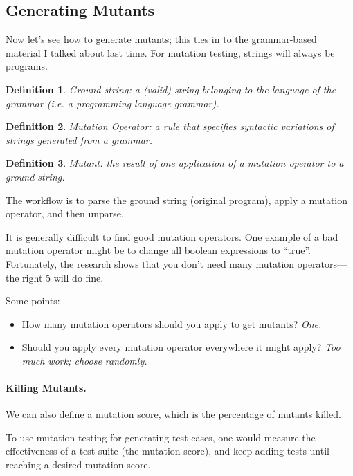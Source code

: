 \documentclass[11pt]{article}
\newtheorem{defn}{Definition}
\begin{document}
\subsection*{Generating Mutants}

Now let's see how to generate mutants; this ties in to the
grammar-based material I talked about last time.  For mutation
testing, strings will always be programs.

\begin{defn}
Ground string: a (valid) string belonging to the language of the grammar (i.e. 
a programming language grammar).
\end{defn}

\begin{defn}
Mutation Operator: a rule that specifies syntactic variations of
strings generated from a grammar.
\end{defn}

\begin{defn}
Mutant: the result of one application of a mutation operator to a 
ground string.
\end{defn}

The workflow is to parse the ground string (original program), apply a
mutation operator, and then unparse.

It is generally difficult to find good mutation operators. One example
of a bad mutation operator might be to change all boolean expressions to
``true''. Fortunately, the research shows that you don't need many
mutation operators---the right 5 will do fine.

Some points:
\begin{itemize}[noitemsep]
\item How many mutation operators should you apply to get mutants? \emph{One.}
\item Should you apply every mutation operator everywhere it might apply? \emph{Too much work; choose randomly.}
\end{itemize}

\paragraph{Killing Mutants.} 
We can also define a mutation score, which is the percentage of mutants killed.

To use mutation testing for generating test cases, one would measure
the effectiveness of a test suite (the mutation score), and keep adding
tests until reaching a desired mutation score.
\end{document}

